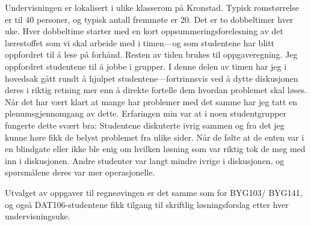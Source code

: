 \documentclass[a4paper,norsk,12pt]{article}
\begin{document}
Undervisningen er lokalisert i ulike klasserom på Kronstad. Typisk rom\-størrelse er til 40 personer, og typisk antall fremmøte er 20. Det er to dobbeltimer hver uke. Hver dobbeltime starter med en kort oppsummeringsforelesning av det lærestoffet som vi skal arbeide med i timen---og som studentene har blitt oppfordret til å lese på forhånd. Resten av tiden brukes til oppgaveregning. Jeg oppfordret studentene til å jobbe i grupper. I denne delen av timen har jeg i hovedsak gått rundt å hjulpet studentene---fortrinnsvis ved å dytte diskusjonen deres i riktig retning mer enn å direkte fortelle dem hvordan problemet skal løses. Når det har vært klart at mange har problemer med det samme har jeg tatt en plenumsgjennomgang av dette. Erfaringen min var at i noen studentgrupper fungerte dette svært bra: Studentene diskuterte ivrig sammen og fra det jeg kunne høre fikk de belyst problemet fra ulike sider. Når de følte at de enten var i en blindgate eller ikke ble enig om hvilken løsning som var riktig tok de meg med inn i diskusjonen. Andre studenter var langt mindre ivrige i diskusjonen, og spørsmålene deres var mer operasjonelle.

Utvalget av oppgaver til regneøvingen er det samme som for BYG103/ BYG141, og også DAT106-studentene fikk tilgang til skriftlig løsningsforslag etter hver undervisningsuke. 
\end{document}
